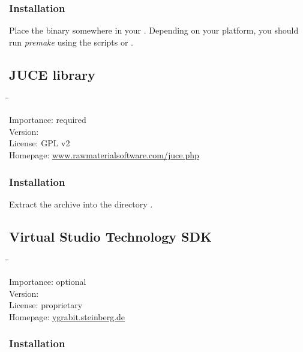 \subsubsection{Installation}

Place the binary somewhere in your .  Depending on your
platform, you should run \emph{premake} using the scripts
 or .

\subsection{JUCE library}

\begin{tabbing}
  \hspace*{6em}\=\=\kill

  Importance:  \> required \\
  Version:      \\
  License:     \> GPL v2 \\
  Homepage:    \> \href{http://www.rawmaterialsoftware.com/juce.php}{www.rawmaterialsoftware.com/juce.php}
\end{tabbing}

\subsubsection{Installation}

Extract the archive into the directory .

\subsection{Virtual Studio Technology SDK}

\begin{tabbing}
  \hspace*{6em}\=\=\kill

  Importance:  \> optional \\
  Version:      \\
  License:     \> proprietary \\
  Homepage:    \> \href{http://ygrabit.steinberg.de/}{ygrabit.steinberg.de}
\end{tabbing}

\subsubsection{Installation}

